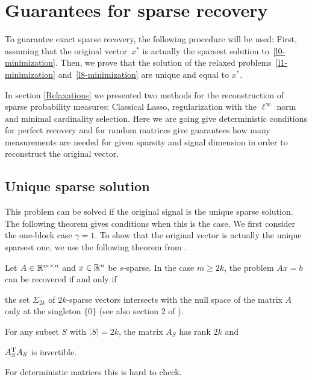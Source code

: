 \documentclass{article} %
\begin{document}
\section{Guarantees for sparse recovery}
To guarantee exact sparse recovery, the following procedure will be used: First, assuming that the original vector~$x^*$ is actually the sparsest solution to~\eqref{l0-minimization}. Then, we prove that the solution of the relaxed problems~\eqref{l1-minimization} and~\eqref{l8-minimization} are unique and equal to $x^*$.

In section \ref{Relaxations} we presented two methods for the reconstruction of sparse probability measures:  Classical Lasso, regularization with the $\ell^\infty$ norm and minimal cardinality selection. Here we are going give deterministic conditions for perfect recovery and for random matrices give guarantees how many measurements are needed for given sparsity and signal dimension in order to reconstruct the original vector.

\subsection{Unique sparse solution}

This problem can be solved if the original signal is the unique sparse solution. The following theorem gives conditions when this is the case. 
We first consider the one-block case $\gamma = 1$. 
To show that the original vector is actually the unique sparsest one, we use the following theorem from \cite{Dahmen_CS}.
\begin{theorem}
\label{thm:l0unique}
Let $A \in \mathbb{R}^{m\times n}$ and $x\in\mathbb{R}^n$ be $s$-sparse. In the case
$m\geq 2k$, the problem $Ax = b$ can be recovered if and only if
\begin{compactenum}[(a)]
\item the set $\Sigma_{2k}$ of $2k$-sparse vectors intersects with the null space of the matrix $A$ only at the singleton $\{0\}$ (see also section 2 of \cite{Dahmen_CS}).
\item For any subset $S$ with $|S| = 2k$, the matrix $A_S$ has rank $2k$ and
\item $A_S^{\rm T} A_S$ is invertible.
\end{compactenum}
\end{theorem}
For deterministic matrices this is hard to check.
\end{document}
